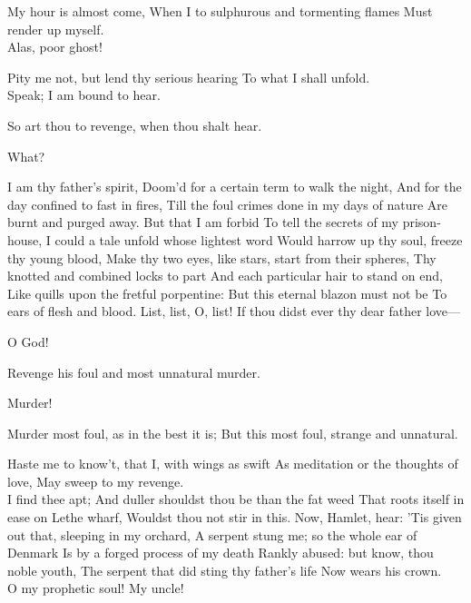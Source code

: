 \documentclass[11pt]{book}
\begin{document}
	                  My hour is almost come,
	When I to sulphurous and tormenting flames
	Must render up myself. \\

\1	Alas, poor ghost!

	Pity me not, but lend thy serious hearing
	To what I shall unfold. \\

\1	Speak; I am bound to hear.

	 So art thou to revenge, when thou shalt hear.

\1	What?

	I am thy father's spirit,
	Doom'd for a certain term to walk the night,
	And for the day confined to fast in fires,
	Till the foul crimes done in my days of nature
	Are burnt and purged away. But that I am forbid
	To tell the secrets of my prison-house,
	I could a tale unfold whose lightest word
	Would harrow up thy soul, freeze thy young blood,
	Make thy two eyes, like stars, start from their spheres,
	Thy knotted and combined locks to part
	And each particular hair to stand on end,
	Like quills upon the fretful porpentine:
	But this eternal blazon must not be
	To ears of flesh and blood. List, list, O, list!
	If thou didst ever thy dear father love---

\1	O God!

	Revenge his foul and most unnatural murder.

\1	Murder!

	Murder most foul, as in the best it is;
	But this most foul, strange and unnatural.

\1	Haste me to know't, that I, with wings as swift
	As meditation or the thoughts of love,
	May sweep to my revenge. \\

	I find thee apt;
	And duller shouldst thou be than the fat weed
	That roots itself in ease on Lethe wharf,
	Wouldst thou not stir in this. Now, Hamlet, hear:
	'Tis given out that, sleeping in my orchard,
	A serpent stung me; so the whole ear of Denmark
	Is by a forged process of my death
	Rankly abused: but know, thou noble youth,
	The serpent that did sting thy father's life
	Now wears his crown. \\

\1	O my prophetic soul!
   My uncle!
\end{document}

